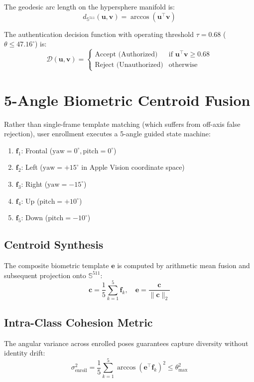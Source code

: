 \documentclass[11pt,a4paper]{article}
\begin{document}
The geodesic arc length on the hypersphere manifold is:
\begin{equation}
d_{\mathbb{S}^{511}}(\mathbf{u}, \mathbf{v}) = \arccos(\mathbf{u}^\top \mathbf{v})
\end{equation}

The authentication decision function with operating threshold $\tau = 0.68$ ($\theta \le 47.16^\circ$) is:
\begin{equation}
\mathcal{D}(\mathbf{u}, \mathbf{v}) = \begin{cases}
\text{Accept (Authorized)} & \text{if } \mathbf{u}^\top \mathbf{v} \ge 0.68 \\
\text{Reject (Unauthorized)} & \text{otherwise}
\end{cases}
\end{equation}

\section{5-Angle Biometric Centroid Fusion}

Rather than single-frame template matching (which suffers from off-axis false rejection), user enrollment executes a 5-angle guided state machine:
\begin{enumerate}
    \item $\mathbf{f}_1$: Frontal ($\text{yaw}=0^\circ, \text{pitch}=0^\circ$)
    \item $\mathbf{f}_2$: Left ($\text{yaw}=+15^\circ$ in Apple Vision coordinate space)
    \item $\mathbf{f}_3$: Right ($\text{yaw}=-15^\circ$)
    \item $\mathbf{f}_4$: Up ($\text{pitch}=+10^\circ$)
    \item $\mathbf{f}_5$: Down ($\text{pitch}=-10^\circ$)
\end{enumerate}

\subsection{Centroid Synthesis}
The composite biometric template $\mathbf{e}$ is computed by arithmetic mean fusion and subsequent projection onto $\mathbb{S}^{511}$:
\begin{equation}
\mathbf{c} = \frac{1}{5} \sum_{k=1}^5 \mathbf{f}_k, \quad \mathbf{e} = \frac{\mathbf{c}}{\|\mathbf{c}\|_2}
\end{equation}

\subsection{Intra-Class Cohesion Metric}
The angular variance across enrolled poses guarantees capture diversity without identity drift:
\begin{equation}
\sigma_{\text{enroll}}^2 = \frac{1}{5} \sum_{k=1}^5 \arccos(\mathbf{e}^\top \mathbf{f}_k)^2 \le \theta_{\text{max}}^2
\end{equation}
\end{document}
